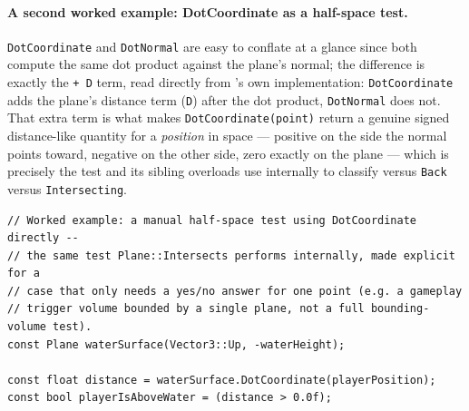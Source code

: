 \paragraph{A second worked example: DotCoordinate as a half-space test.}
\texttt{DotCoordinate} and \texttt{DotNormal} are easy to conflate at a glance since both
compute the same dot product against the plane's normal; the difference is exactly the
\texttt{+ D} term, read directly from 's own implementation:
\texttt{DotCoordinate} adds the plane's distance term (\texttt{D}) after the dot product,
\texttt{DotNormal} does not. That extra term is what makes \texttt{DotCoordinate(point)} return
a genuine signed distance-like quantity for a \emph{position} in space --- positive on the
side the normal points toward, negative on the other side, zero exactly on the plane ---
which is precisely the test  and its sibling
overloads use internally to classify  versus
\texttt{Back} versus \texttt{Intersecting}.

\begin{lstlisting}
// Worked example: a manual half-space test using DotCoordinate directly --
// the same test Plane::Intersects performs internally, made explicit for a
// case that only needs a yes/no answer for one point (e.g. a gameplay
// trigger volume bounded by a single plane, not a full bounding-volume test).
const Plane waterSurface(Vector3::Up, -waterHeight);

const float distance = waterSurface.DotCoordinate(playerPosition);
const bool playerIsAboveWater = (distance > 0.0f);
\end{lstlisting}

